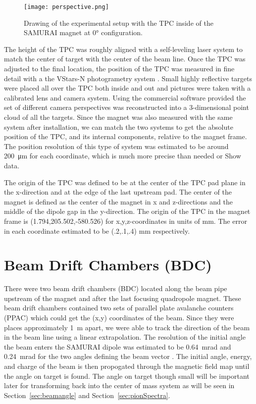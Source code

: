 \begin{figure}
\texttt{[image: perspective.png]}
\caption{Drawing of the experimental setup with the TPC inside of the SAMURAI magnet at $\ang{0}$ configuration.}
\label{fig:experiment}
\end{figure}

The height of the TPC was roughly aligned with a self-leveling laser system to match the center of target with the center of the beam line. Once the TPC was adjusted to the final location, the position of the TPC was measured in fine detail with a the VStars-N photogrametry system \cite{vstars}. Small highly reflective targets were placed all over the TPC both inside and out and pictures were taken with a calibrated lens and camera system. Using the commercial software provided the set of different camera perspectives was reconstructed into a 3-dimensional point cloud of all the targets. Since the magnet was also measured with the same system after installation, we can match the two systems to get the absolute position of the TPC, and its internal components, relative to the magnet frame. The position resolution of this type of system was estimated to be around \SI{200}{\micro\metre} for each coordinate, which is much more precise than needed or Show data.

The origin of the \spirit TPC was defined to be at the center of the TPC pad plane in the x-direction and at the edge of the last upstream pad. The center of the magnet is defined as the center of the magnet in x and z-directions and the middle of the dipole gap in the y-direction. The origin of the \spirit TPC in the magnet frame is (1.794,205.502,-580.526) for x,y,z-coordinates in units of \si{\milli\metre}. The error in each coordinate estimated to be (.2,.1,.4) \si{\milli\metre} respectively. 


\section{Beam Drift Chambers (BDC)}
\label{sec:bdc}

There were two beam drift chambers (BDC) located along the beam pipe upstream of the magnet and after the last focusing quadropole magnet. These beam drift chambers contained two sets of parallel plate avalanche counters (PPAC) which could get the (x,y) coordinates of the beam. Since they were places approximately \SI{1}{\metre} apart, we were able to track the direction of the beam in the beam line using a linear extrapolation. The resolution of the initial angle the beam enters the SAMURAI dipole was estimated to be \SI{0.64}{\milli\radian} and \SI{0.24}{\milli\radian} for the two angles defining the beam vector \cite{jon}. The initial angle, energy, and charge of the beam is then propogated through the magnetic field map until the angle on target is found. The angle on target though small will be important later for transforming back into the center of mass system as will be seen in Section~\ref{sec:beamangle} and Section~\ref{sec:pionSpectra}.


